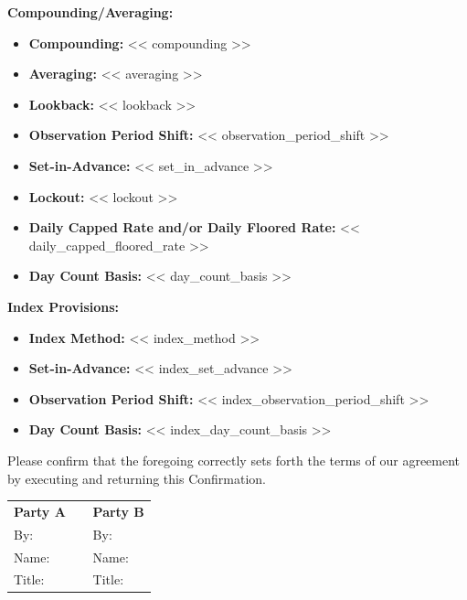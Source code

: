 \documentclass[11pt, a4paper]{article}
\newcommand{\templatetag}[1]{} %
\begin{document}
\templatetag{<<- if compounding_averaging_applicable >>}
\vspace{0.15cm}
\noindent \textbf{Compounding/Averaging:}
\begin{itemize}[leftmargin=2cm, label={}, itemsep=1pt]
\templatetag{<<- if compounding >>}
    \item \textbf{Compounding:} << compounding >>
\templatetag{<<- endif >>}
\templatetag{<<- if averaging >>}
    \item \textbf{Averaging:} << averaging >>
\templatetag{<<- endif >>}
\templatetag{<<- if lookback >>}
    \item \textbf{Lookback:} << lookback >>
\templatetag{<<- endif >>}
\templatetag{<<- if observation_period_shift >>}
    \item \textbf{Observation Period Shift:} << observation_period_shift >>
\templatetag{<<- endif >>}
    \item \textbf{Set-in-Advance:} << set_in_advance >>
\templatetag{<<- if lockout >>}
    \item \textbf{Lockout:} << lockout >>
\templatetag{<<- endif >>}
\templatetag{<<- if daily_capped_floored_rate >>}
    \item \textbf{Daily Capped Rate and/or Daily Floored Rate:} << daily_capped_floored_rate >>
\templatetag{<<- endif >>}
    \item \textbf{Day Count Basis:} << day_count_basis >>
\end{itemize}
\templatetag{<<- endif >>}

\templatetag{<<- if index_provisions_applicable >>}
\vspace{0.15cm}
\noindent \textbf{Index Provisions:}
\begin{itemize}[leftmargin=2cm, label={}, itemsep=1pt]
    \item \textbf{Index Method:} << index_method >>
    \item \textbf{Set-in-Advance:} << index_set_advance >>
    \item \textbf{Observation Period Shift:} << index_observation_period_shift >>
    \item \textbf{Day Count Basis:} << index_day_count_basis >>
\end{itemize}
\templatetag{<<- endif >>}

\templatetag{<<- endif >>}

\vspace{0.4cm}

\noindent Please confirm that the foregoing correctly sets forth the terms of our agreement by executing and returning this Confirmation.

\vspace{0.8cm}

\noindent
\begin{tabular}{@{}p{0.45\linewidth} p{0.1\linewidth} p{0.45\linewidth}@{}}
\textbf{Party A} & & \textbf{Party B} \\[0.4cm]
By: \hrulefill & & By: \hrulefill \\
Name: \hrulefill & & Name: \hrulefill \\
Title: \hrulefill & & Title: \hrulefill \\
\end{tabular}
\end{document}
